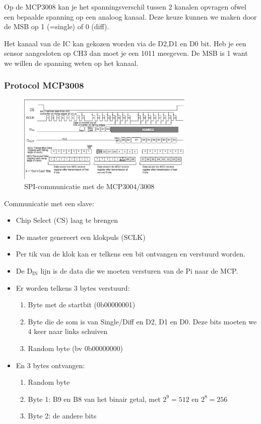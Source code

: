 \documentclass{article}
\begin{document}
Op de MCP3008 kan je het spanningsverschil tussen 2 kanalen opvragen ofwel een bepaalde spanning op een
analoog kanaal. Deze keuze kunnen we maken door de MSB op 1 (=single) of 0 (diff).

Het kanaal van de IC kan gekozen worden via de D2,D1 en D0 bit. 
Heb je een sensor aangesloten op CH3 dan moet je een 1011 meegeven. 
De MSB is 1 want we willen de spanning weten op het kanaal.

\subsubsection{Protocol MCP3008}

\begin{figure}[H]
    \centering
    \includegraphics[width=0.75\textwidth]{timing-spi-mcp.png}
    \caption{SPI-communicatie met de MCP3004/3008}
\end{figure}

Communicatie met een slave:

\begin{itemize}
    \item Chip Select (CS) laag te brengen
    \item De master genereert een klokpuls (SCLK)
    \item Per tik van de klok kan er telkens een bit ontvangen en verstuurd worden.
    \item De $\text{D}_{\text{IN}}$ lijn is de data die we moeten versturen van de Pi naar de MCP.
    \item Er worden telkens 3 bytes verstuurd:
    \begin{enumerate}
        \item Byte met de startbit (0b00000001)
        \item Byte die de som is van Single/Diff en D2, D1 en D0. Deze bits moeten we 4 keer naar links schuiven
        \item Random byte (bv 0b00000000)
    \end{enumerate}
    \item En 3 bytes ontvangen:
    \begin{enumerate}
        \item Random byte 
        \item Byte 1: B9 en B8 van het binair getal, met $2^9=512$  en $2^8=256$
        \item Byte 2: de andere bits
    \end{enumerate}
\end{itemize}
\end{document}
